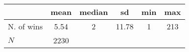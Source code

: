 {
\def\sym#1{\ifmmode^{#1}\else\(^{#1}\)\fi}
\begin{tabular}{l*{1}{ccccc}}
\hline\hline
            &        mean&      median&          sd&         min&         max\\
\hline
N. of wins  &        5.54&           2&       11.78&           1&         213\\
\hline
\(N\)       &        2230&            &            &            &            \\
\hline\hline
\end{tabular}
}
